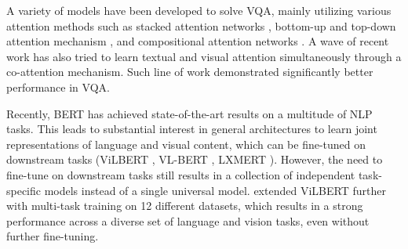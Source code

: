 \documentclass{article}
\begin{document}

A variety of models have been developed to solve VQA, mainly utilizing various attention methods such as stacked attention networks \citep{yang2016vqa}, bottom-up and top-down attention mechanism \citep{Anderson_2018_CVPR}, and compositional attention networks \citep{hudson2018mac}. A wave of recent work has also tried to learn textual and visual attention simultaneously through a co-attention mechanism. Such line of work \citep{yu2019mcan, Nguyen_2018_CVPR} demonstrated significantly better performance in VQA. 

Recently, BERT \citep{devlin-etal-2019-bert} has achieved state-of-the-art results on a multitude of NLP tasks. This leads to substantial interest in general architectures to learn joint representations of language and visual content, which can be fine-tuned on downstream tasks (ViLBERT \citep{lu2019vilbert}, VL-BERT \citep{Su2020VL-BERT}, LXMERT \citep{tan2019lxmert}). However, the need to fine-tune on downstream tasks still results in a collection of independent task-specific models instead of a single universal model. \citet{lu2020multitask} extended ViLBERT further with multi-task training on 12 different datasets, which results in a strong performance across a diverse set of language and vision tasks, even without further fine-tuning.
\end{document}
